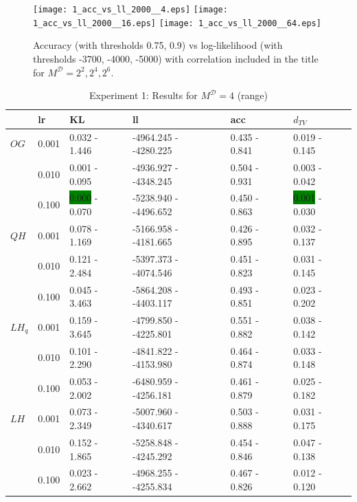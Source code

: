 \documentclass[shortabstract]{iithesis}
\begin{document}
\newpage

\begin{figure}[!ht]
    \centering
    \texttt{[image: 1\_acc\_vs\_ll\_2000\_\_4.eps]}
    \texttt{[image: 1\_acc\_vs\_ll\_2000\_\_16.eps]}
    \texttt{[image: 1\_acc\_vs\_ll\_2000\_\_64.eps]}
    \caption{Accuracy (with thresholds 0.75, 0.9) vs log-likelihood (with thresholds -3700, -4000, -5000) with correlation included in the title for $M^{\mathcal D} = 2^2, 2^4, 2^6$.}
    \label{fig:cor_ex1}
\end{figure}


\pagebreak

\begin{table}[!ht]
\centering
\caption{Experiment 1: Results for $M^{\mathcal D}=4$ (range)}  %
\vspace{5mm}
\begin{tabular}{llllll}  \hline
& lr &   KL &                      ll &               acc &              $d_{TV}$ \\ \hline
$OG$  & 0.001 &  0.032 - 1.446 &  -4964.245 - -4280.225 &  0.435 - 0.841 &  0.019 - 0.145 \\
        & 0.010 &  0.001 - 0.095 &  -4936.927 - -4348.245 &  0.504 - 0.931 &  0.003 - 0.042 \\
        & 0.100 &     \colorbox{green}{0.000} - 0.070 &   -5238.940 - -4496.652 &   0.450 - 0.863 &   \colorbox{green}{0.001} - 0.030 \\
$QH$ & 0.001 &  0.078 - 1.169 &  -5166.958 - -4181.665 &  0.426 - 0.895 &  0.032 - 0.137 \\
        & 0.010 &  0.121 - 2.484 &  -5397.373 - -4074.546 &  0.451 - 0.823 &  0.031 - 0.145 \\
        & 0.100 &  0.045 - 3.463 &  -5864.208 - -4403.117 &  0.493 - 0.851 &  0.023 - 0.202 \\
$LH_q$ & 0.001 &  0.159 - 3.645 &   -4799.850 - -4225.801 &  0.551 - 0.882 &  0.038 - 0.142 \\
        & 0.010 &   0.101 - 2.290 &   -4841.822 - -4153.980 &  0.464 - 0.874 &  0.033 - 0.148 \\
        & 0.100 &  0.053 - 2.002 &  -6480.959 - -4256.181 &  0.461 - 0.879 &  0.025 - 0.182 \\
$LH$ & 0.001 &  0.073 - 2.349 &   -5007.960 - -4340.617 &  0.503 - 0.888 &  0.031 - 0.175 \\
        & 0.010 &  0.152 - 1.865 &  -5258.848 - -4245.292 &  0.454 - 0.846 &  0.047 - 0.138 \\
        & 0.100 &  0.023 - 2.662 &  -4968.255 - -4255.834 &  0.467 - 0.826 &   0.012 - 0.120 \\

\end{tabular}
\end{table}
\end{document}
